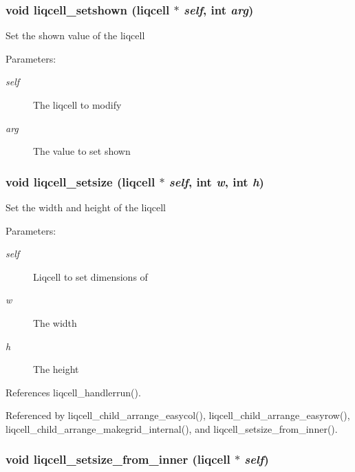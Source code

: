 \subsubsection[{liqcell\_\-setshown}]{\setlength{\rightskip}{0pt plus 5cm}void liqcell\_\-setshown (liqcell $\ast$ {\em self}, \/  int {\em arg})}\label{d5/da2/liqcell_8c_10dd73affd3e1d95561b954075c86a79}


Set the shown value of the liqcell \begin{Desc}
\item[Parameters:]
\begin{description}
\item[{\em self}]The liqcell to modify \item[{\em arg}]The value to set shown \end{description}
\end{Desc}
\subsubsection[{liqcell\_\-setsize}]{\setlength{\rightskip}{0pt plus 5cm}void liqcell\_\-setsize (liqcell $\ast$ {\em self}, \/  int {\em w}, \/  int {\em h})}\label{d5/da2/liqcell_8c_37635b6dfd9e0332df3373a0d4be3b40}


Set the width and height of the liqcell \begin{Desc}
\item[Parameters:]
\begin{description}
\item[{\em self}]Liqcell to set dimensions of \item[{\em w}]The width \item[{\em h}]The height \end{description}
\end{Desc}


References liqcell\_\-handlerrun().

Referenced by liqcell\_\-child\_\-arrange\_\-easycol(), liqcell\_\-child\_\-arrange\_\-easyrow(), liqcell\_\-child\_\-arrange\_\-makegrid\_\-internal(), and liqcell\_\-setsize\_\-from\_\-inner().
\subsubsection[{liqcell\_\-setsize\_\-from\_\-inner}]{\setlength{\rightskip}{0pt plus 5cm}void liqcell\_\-setsize\_\-from\_\-inner (liqcell $\ast$ {\em self})}\label{d5/da2/liqcell_8c_d8232089321484c557d1dc25950fd7e3}



